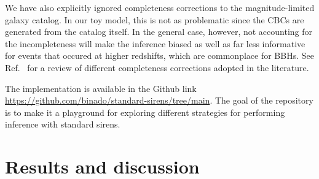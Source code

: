 \documentclass[%
preprint,
nofootinbib,
 amsmath,amssymb,
 aps,
]{revtex4-2}
\begin{document}
We have also explicitly ignored completeness corrections to the magnitude-limited galaxy catalog.
In our toy model, this is not as problematic since the CBCs are generated from the catalog itself.
In the general case, however, not accounting for the incompleteness will make the inference biased
as well as far less informative for events that occured at higher redshifts, which are commonplace
for BBHs. See Ref.~ for a review of different completeness
corrections adopted in the literature.

The implementation is available in the Github link
\url{https://github.com/binado/standard-sirens/tree/main}. The goal of the repository is to make it
a playground for exploring different strategies for performing inference with standard sirens.

\section{Results and discussion}
\label{sec:results}
\end{document}
